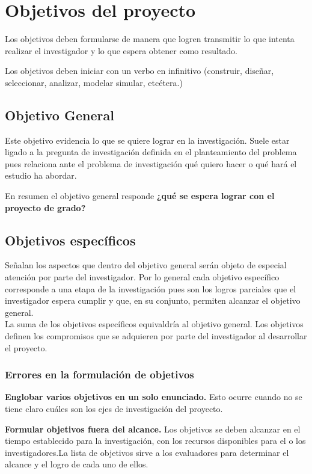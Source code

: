 \section{Objetivos del proyecto}
Los objetivos deben formularse de manera que logren transmitir lo que intenta realizar el investigador y lo que espera obtener como resultado. 

Los objetivos deben iniciar con un verbo en infinitivo (construir, diseñar, seleccionar, analizar, modelar simular, etcétera.) 




\subsection{Objetivo General}
Este objetivo evidencia lo que se quiere lograr en la investigación. Suele estar ligado a la pregunta de investigación definida en el planteamiento del problema pues relaciona ante el problema de investigación qué quiero hacer o qué hará el estudio ha abordar.

En resumen el objetivo general responde \textbf{¿qué se espera lograr con el proyecto de grado?}


\subsection{Objetivos específicos}
Señalan los aspectos que dentro del objetivo general serán objeto de especial atención por parte del investigador. Por lo general cada objetivo específico corresponde a una etapa de la investigación pues son los logros parciales que el investigador espera cumplir y que, en su conjunto, permiten alcanzar el objetivo general. \\

La suma de los objetivos específicos equivaldría al objetivo general. Los objetivos definen los compromisos que se adquieren por parte del investigador al desarrollar el proyecto.  


\subsubsection*{Errores en la formulación de objetivos}

\textbf{Englobar varios objetivos en un solo enunciado.} Esto ocurre cuando no se tiene claro cuáles son los ejes de investigación del proyecto.



\textbf{Formular objetivos fuera del alcance.} Los objetivos se deben alcanzar en el tiempo establecido para la investigación, con los recursos disponibles para el o los investigadores.La lista de objetivos sirve a los evaluadores para determinar el alcance y el logro de cada uno de ellos. 

